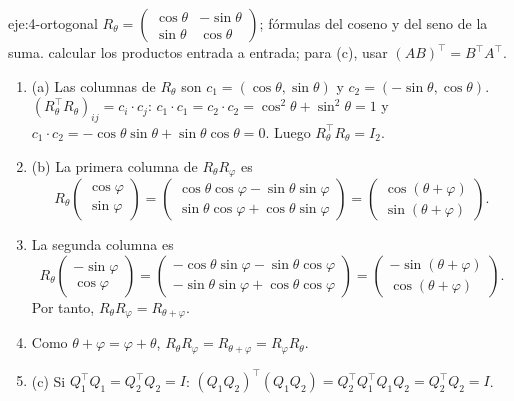 \begin{solucion}{eje:4-ortogonal}
\datos $R_\theta=\begin{pmatrix}\cos\theta&-\sin\theta\\ \sin\theta&\cos\theta\end{pmatrix}$; fórmulas del coseno y del seno de la suma.
\planteamiento calcular los productos entrada a entrada; para (c), usar $(AB)^{\top}=B^{\top}A^{\top}$.
\pasos
\begin{enumerate}[label=\arabic*.]
  \item (a) Las columnas de $R_\theta$ son $c_1=(\cos\theta,\sin\theta)$ y $c_2=(-\sin\theta,\cos\theta)$. $(R_\theta^{\top}R_\theta)_{ij}=c_i\cdot c_j$: $c_1\cdot c_1=c_2\cdot c_2=\cos^{2}\theta+\sin^{2}\theta=1$ y $c_1\cdot c_2=-\cos\theta\sin\theta+\sin\theta\cos\theta=0$. Luego $R_\theta^{\top}R_\theta=I_2$.
  \item (b) La primera columna de $R_\theta R_\varphi$ es
  \[
  R_\theta\begin{pmatrix}\cos\varphi\\ \sin\varphi\end{pmatrix}=\begin{pmatrix}\cos\theta\cos\varphi-\sin\theta\sin\varphi\\ \sin\theta\cos\varphi+\cos\theta\sin\varphi\end{pmatrix}=\begin{pmatrix}\cos(\theta+\varphi)\\ \sin(\theta+\varphi)\end{pmatrix}.
  \]
  \item La segunda columna es
  \[
  R_\theta\begin{pmatrix}-\sin\varphi\\ \cos\varphi\end{pmatrix}=\begin{pmatrix}-\cos\theta\sin\varphi-\sin\theta\cos\varphi\\ -\sin\theta\sin\varphi+\cos\theta\cos\varphi\end{pmatrix}=\begin{pmatrix}-\sin(\theta+\varphi)\\ \cos(\theta+\varphi)\end{pmatrix}.
  \]
  Por tanto, $R_\theta R_\varphi=R_{\theta+\varphi}$.
  \item Como $\theta+\varphi=\varphi+\theta$, $R_\theta R_\varphi=R_{\theta+\varphi}=R_\varphi R_\theta$.
  \item (c) Si $Q_1^{\top}Q_1=Q_2^{\top}Q_2=I$: $(Q_1Q_2)^{\top}(Q_1Q_2)=Q_2^{\top}Q_1^{\top}Q_1Q_2=Q_2^{\top}Q_2=I$.

\end{enumerate}
\end{solucion}
